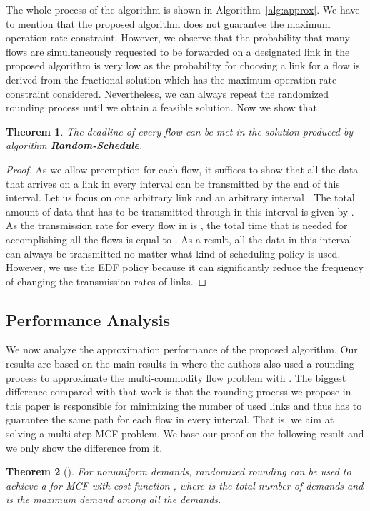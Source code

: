 \documentclass[10pt, conference, compsocconf]{IEEEtran}
\newtheorem{theorem}{Theorem}
\begin{document}
The whole process of the algorithm is shown in Algorithm~\ref{alg:approx}. We have to mention that the proposed algorithm does not guarantee the maximum operation rate constraint. However, we observe that the probability that many flows are simultaneously requested to be forwarded on a designated link in the proposed algorithm is very low as the probability for choosing a link for a flow is derived from the fractional solution which has the maximum operation rate constraint considered. Nevertheless, we can always repeat the randomized rounding process until we obtain a feasible solution. Now we show that 
\begin{theorem}
The deadline of every flow  can be met in the solution produced by algorithm \textbf{Random-Schedule}. 
\end{theorem}
\begin{proof}
As we allow preemption for each flow, it suffices to show that all the data that arrives on a link  in every interval  can be transmitted by the end of this interval. Let us focus on one arbitrary link  and an arbitrary interval . The total amount of data that has to be transmitted through  in this interval is given by . As the transmission rate for every flow in  is , the total time that is needed for accomplishing all the flows is equal to . As a result, all the data in this interval can always be transmitted no matter what kind of scheduling policy is used. However, we use the EDF policy because it can significantly reduce the frequency of changing the transmission rates of links.
\end{proof}

\subsection{Performance Analysis}

We now analyze the approximation performance of the proposed algorithm. Our results are based on the main results in \cite{Andrews_Fernandez-SS-2010} where the authors also used a rounding process to approximate the multi-commodity flow problem with . The biggest difference compared with that work is that the rounding process we propose in this paper is responsible for minimizing the number of used links and thus has to guarantee the same path for each flow in every interval. That is, we aim at solving a multi-step MCF problem. We base our proof on the following result and we only show the difference from it.

\begin{theorem}[\cite{Andrews_Fernandez-SS-2010}]
\label{thm:mcf}
For nonuniform demands, randomized rounding can be used to achieve a  for MCF with cost function , where  is the total number of demands and  is the maximum demand among all the demands.
\end{theorem}
\end{document}
